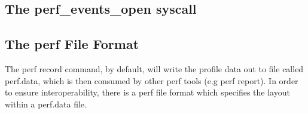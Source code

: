 \subsection{The perf\_events\_open syscall}

\subsection{The perf File Format}

The perf record command, by default, will write the profile data out to file called perf.data, which is then consumed by other perf tools (e.g perf report). In order to ensure interoperability, there is a perf file format which specifies the layout within a perf.data file.

